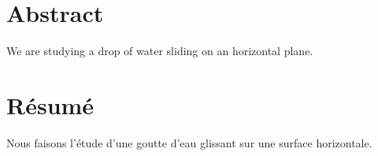 \begingroup
\let\clearpage\relax
\let\cleardoublepage\relax
\let\cleardoublepage\relax

\chapter*{Abstract}
We are studying a drop of water sliding on an horizontal plane.

\vfill


\chapter*{Résumé}
Nous faisons l'étude d'une goutte d'eau glissant sur une surface horizontale.

\endgroup

\vfill
